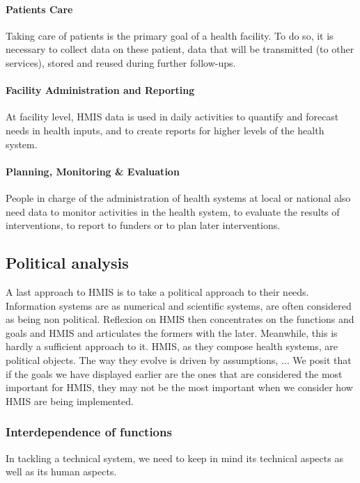 \documentclass[a4paper,11pt,final,twoside]{article}
\begin{document}
\paragraph{Patients Care} Taking care of patients is the primary goal of a health facility. To do so, it is necessary to collect data on these patient, data that will be transmitted (to other services), stored and reused during further follow-ups. 

\paragraph{Facility Administration and Reporting} At facility level, HMIS data is used in daily activities to quantify and forecast needs in health inputs, and to create reports for higher levels of the health system. 

\paragraph{Planning, Monitoring \& Evaluation } People in charge of the administration of health systems at local or national also need data to monitor activities in the health system, to evaluate the results of interventions, to report to funders or to plan later interventions.

	\subsection{Political analysis}

A last approach to HMIS is to take a political approach to their needs. Information systems are as numerical and scientific systems, are often considered as being non political. Reflexion on HMIS then concentrates on the functions and goals and HMIS and articulates the formers with the later. Meanwhile, this is hardly a sufficient approach to it. HMIS, as they compose health systems, are political objects. The way they evolve is driven by assumptions, ... We posit that if the goals we have displayed earlier are the ones that are considered the most important for HMIS, they may not be the most important when we consider how HMIS are being implemented.

\subsubsection{Interdependence of functions}

In tackling a technical system, we need to keep in mind its technical aspects as well as its human aspects.
\end{document}
